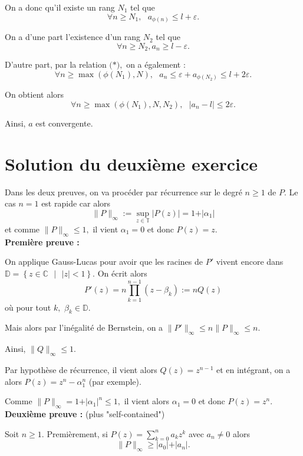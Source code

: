 On a donc qu'il existe un rang $N_{1}$ tel que $$\forall n\geq N_{1},\mbox{ } a_{\phi(n)}\leq l+\varepsilon.$$

On a d'une part l'existence d'un rang $N_{2}$ tel que $$\forall n\geq N_{2}, a_{n}\geq l-\varepsilon.$$

D'autre part, par la relation $\mbox{(*)},$ on a également : $$\forall n\geq \max{(\phi(N_{1}),N)},\mbox{ } a_{n}\leq \varepsilon + a_{\phi(N_{2})}\leq l+2\varepsilon.$$

On obtient alors $$\forall n\geq \max{(\phi(N_{1}),N,N_{2})},\mbox{ } \vert a_{n}-l\vert \leq 2\varepsilon.$$

Ainsi, $a$ est convergente.


\section{Solution du deuxième exercice}

Dans les deux preuves, on va procéder par récurrence sur le degré $n\geq 1$ de $P.$
Le cas $n=1$ est rapide car alors $$\|P\|_{\infty}:=\sup_{z\in\mathbb{T}}\vert P(z)\vert=1+\vert \alpha_{1} \vert$$ et comme $\|P\|_{\infty}\leq 1,$ il vient $\alpha_{1}=0$ et donc $P(z)=z.$\\

\textbf{Première preuve :}

On applique Gauss-Lucas pour avoir que les racines de $P'$ vivent encore dans $\displaystyle \mathbb{D}=\left\{z\in\mathbb{C}\mbox{ }|\mbox{ } \vert z\vert <1\right\}.$
On écrit alors $$ P'(z)=n\prod_{k=1}^{n-1}(z-\beta_{k}):=nQ(z)$$ où pour tout $k,$ $\beta_{k}\in\mathbb{D}.$

Mais alors par l'inégalité de Bernstein, on a $\displaystyle \|P'\|_{\infty}\leq n\|P\|_{\infty}\leq n.$

Ainsi, $\|Q\|_{\infty}\leq 1.$

Par hypothèse de récurrence, il vient alors $Q(z)=z^{n-1}$ et en intégrant, on a alors $\displaystyle P(z)=z^{n}-\alpha_{1}^{n}$ (par exemple).

Comme $\displaystyle \|P\|_{\infty}=1+\vert \alpha_{1}\vert^{n}\leq 1,$ il vient alors $\alpha_{1}=0$ et donc $P(z)=z^{n}.$\\

\textbf{Deuxième preuve :} (plus "self-contained")

Soit $n\geq 1.$ Premièrement, si $\displaystyle P(z)=\sum_{k=0}^{n}a_{k}z^{k}$ avec $a_{n}\neq 0$ alors $$\|P\|_{\infty}\geq \vert a_{0} \vert + \vert a_{n}\vert.$$


